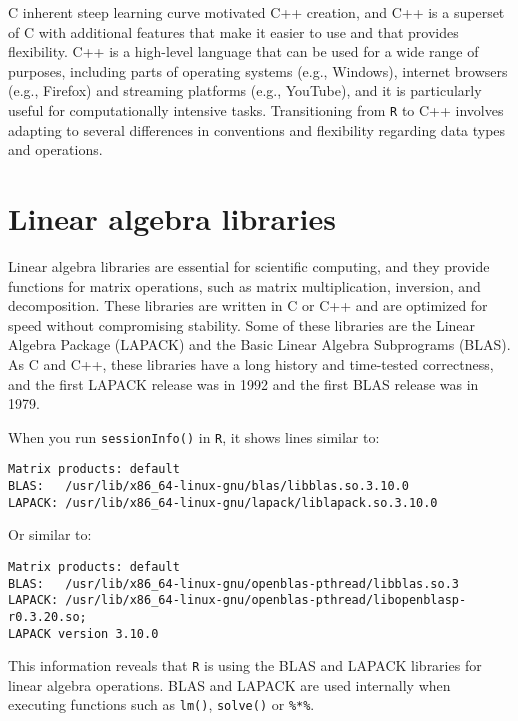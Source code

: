 C inherent steep learning curve motivated C++ creation, and C++ is a
superset of C with additional features that make it easier to use and that
provides flexibility. C++ is a high-level language that can be used for a
wide range of purposes, including parts of operating systems (e.g., Windows),
internet browsers (e.g., Firefox) and streaming platforms (e.g., YouTube),
and it is particularly useful for computationally intensive tasks. Transitioning
from \texttt{R} to C++ involves adapting to several differences in conventions and
flexibility regarding data types and operations.

\hypertarget{linear-algebra-libraries}{%
\section{Linear algebra libraries}\label{linear-algebra-libraries}}

Linear algebra libraries are essential for scientific computing, and they
provide functions for matrix operations, such as matrix multiplication,
inversion, and decomposition. These libraries are written in C or C++ and
are optimized for speed without compromising stability. Some of these libraries
are the Linear Algebra Package (LAPACK) and the Basic Linear Algebra
Subprograms (BLAS). As C and C++, these libraries have a long history and
time-tested correctness, and the first LAPACK release was in 1992 and the first
BLAS release was in 1979.

When you run \texttt{sessionInfo()} in \texttt{R}, it shows lines similar to:

\begin{verbatim}
Matrix products: default
BLAS:   /usr/lib/x86_64-linux-gnu/blas/libblas.so.3.10.0 
LAPACK: /usr/lib/x86_64-linux-gnu/lapack/liblapack.so.3.10.0
\end{verbatim}

Or similar to:

\begin{verbatim}
Matrix products: default
BLAS:   /usr/lib/x86_64-linux-gnu/openblas-pthread/libblas.so.3 
LAPACK: /usr/lib/x86_64-linux-gnu/openblas-pthread/libopenblasp-r0.3.20.so;
LAPACK version 3.10.0
\end{verbatim}

This information reveals that \texttt{R} is using the BLAS and LAPACK libraries for
linear algebra operations. BLAS and LAPACK are used internally when executing
functions such as \texttt{lm()}, \texttt{solve()} or \texttt{\%*\%}.

